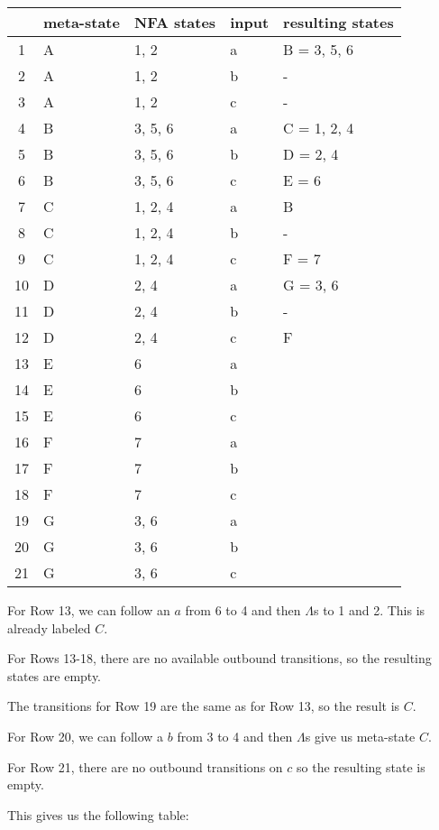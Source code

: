 \documentclass[letterpaper,12pt,openany,reqno]{book}%
\begin{document}
\begin{center}
\small
\begin{tabular}{c|l|l|l|l}
\hline
& \textbf{meta-state} & \textbf{NFA states} & \textbf{input} & \textbf{resulting states} \\
\hline
1 & A & 1, 2 & a & B = 3, 5, 6 \\
2 & A & 1, 2 & b & - \\
3 & A & 1, 2 & c & - \\
4 & B & 3, 5, 6 & a & C = 1, 2, 4 \\
5 & B & 3, 5, 6 & b & D = 2, 4 \\
6 & B & 3, 5, 6 & c & E = 6 \\
7 & C & 1, 2, 4 & a & B\\
8 & C & 1, 2, 4 & b & -\\
9 & C & 1, 2, 4 & c & F = 7 \\
10 & D & 2, 4 & a & G = 3, 6\\
11 & D & 2, 4 & b & - \\
12 & D & 2, 4 & c & F \\
13 & E & 6 & a & \\
14 & E & 6 & b & \\
15 & E & 6 & c & \\
16 & F & 7 & a & \\
17 & F & 7 & b & \\
18 & F & 7 & c & \\
19 & G & 3, 6 & a & \\
20 & G & 3, 6 & b & \\
21 & G & 3, 6 & c & \\
\hline
\end{tabular}
\end{center}

For Row 13, we can follow an $a$ from 6 to 4 and then $\Lambda$s to 1 and 2. This is already labeled $C$.

For Rows 13-18, there are no available outbound transitions, so the resulting states are empty.

The transitions for Row 19 are the same as for Row 13, so the result is $C$.

For Row 20, we can follow a $b$ from 3 to 4 and then $\Lambda$s give us meta-state $C$.

For Row 21, there are no outbound transitions on $c$ so the resulting state is empty.

This gives us the following table:
\end{document}
